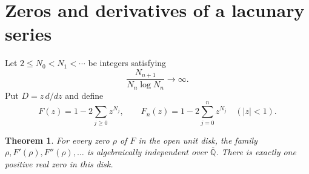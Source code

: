 \documentclass[11pt,a4paper]{article}
\newtheorem{theorem}{Theorem}[section]
\theoremstyle{definition}
\theoremstyle{remark}
\newcommand{\K}{\overline{\mathbb Q}}
\numberwithin{equation}{section}
\begin{document}
\section{Zeros and derivatives of a lacunary series}\label{sec:lacunary}
Let $2\le N_0<N_1<\cdots$ be integers satisfying
\begin{equation}\label{eq:gaps}
 \frac{N_{n+1}}{N_n\log N_n}\longrightarrow\infty.
\end{equation}
Put $D=z\,d/dz$ and define
\[
 F(z)=1-2\sum_{j\ge0}z^{N_j},\qquad
 F_n(z)=1-2\sum_{j=0}^{n}z^{N_j}\quad (|z|<1).
\]
\begin{theorem}\label{thm:lac}
For every zero $\rho$ of $F$ in the open unit disk, the family
$\rho,F'(\rho),F''(\rho),\ldots$ is algebraically independent over $\K$.
There is exactly one positive real zero in this disk.
\end{theorem}
\end{document}

